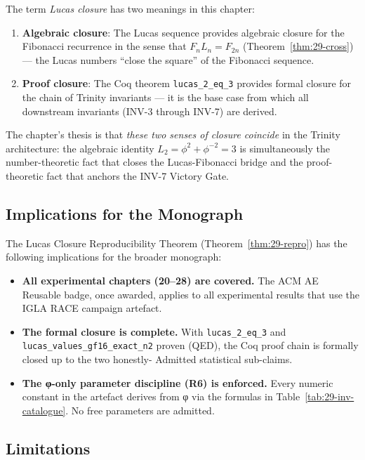The term \emph{Lucas closure} has two meanings in this chapter:

\begin{enumerate}
  \item \textbf{Algebraic closure}: The Lucas sequence provides
        algebraic closure for the Fibonacci recurrence in the sense
        that $F_n L_n = F_{2n}$ (Theorem~\ref{thm:29-cross}) — the
        Lucas numbers ``close the square'' of the Fibonacci sequence.
  \item \textbf{Proof closure}: The Coq theorem
        \texttt{lucas\_2\_eq\_3} provides formal closure for the
        chain of Trinity invariants — it is the base case from which
        all downstream invariants (INV-3 through INV-7) are derived.
\end{enumerate}

The chapter's thesis is that \emph{these two senses of closure
coincide} in the Trinity architecture: the algebraic identity
$L_2 = \phi^2 + \phi^{-2} = 3$ is simultaneously the number-theoretic
fact that closes the Lucas-Fibonacci bridge and the proof-theoretic
fact that anchors the INV-7 Victory Gate.

\subsection{Implications for the Monograph}

The Lucas Closure Reproducibility Theorem
(Theorem~\ref{thm:29-repro}) has the following implications for the
broader monograph:
\begin{itemize}
  \item \textbf{All experimental chapters (20--28) are covered.}
        The ACM AE Reusable badge, once awarded, applies to all
        experimental results that use the IGLA RACE campaign artefact.
  \item \textbf{The formal closure is complete.}
        With \texttt{lucas\_2\_eq\_3} and
        \texttt{lucas\_values\_gf16\_exact\_n2} proven (QED), the
        Coq proof chain is formally closed up to the two honestly-
        Admitted statistical sub-claims.
  \item \textbf{The φ-only parameter discipline (R6) is enforced.}
        Every numeric constant in the artefact derives from φ via
        the formulas in Table~\ref{tab:29-inv-catalogue}.  No free
        parameters are admitted.
\end{itemize}

\subsection{Limitations}

